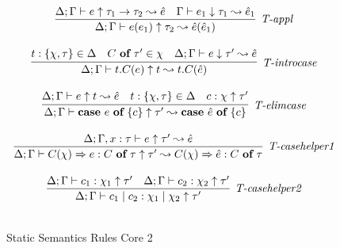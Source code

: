 \begin{figure}
\[\begin{array}{c}
\infer[\textit{T-appl}]
	{\Delta; \Gamma \vdash  e(e_1) \uparrow\tau_2  \leadsto \hat{e}(\hat{e}_1) } 
	{\Delta; \Gamma \vdash e \uparrow \tau_1 \rightarrow \tau_2  \leadsto \hat{e}  & \Gamma \vdash e_1 \downarrow \tau_1 \leadsto \hat{e}_1 }\\[3ex]

\infer[\textit{T-introcase}]
	{\Delta; \Gamma \vdash  t.C(e) \uparrow t  \leadsto t.C(\hat{e}) } 
	{t:\{\chi, \tau\} \in \Delta & C\ \keyw{of}\ \tau' \in \chi &\Delta; \Gamma \vdash e \downarrow \tau'  \leadsto \hat{e}}\\[3ex]

\infer[\textit{T-elimcase}]
	{\Delta; \Gamma \vdash  \keyw{case}~e~\keyw{of}~\{ c \} \uparrow\tau'  \leadsto \keyw{case}~\hat{e}~\keyw{of}~\{ c \} } 
	{\Delta; \Gamma \vdash e \uparrow t  \leadsto \hat{e}  & t:\{ \chi,\tau\} \in \Delta & c:\chi \uparrow \tau'}\\[3ex]

\infer[\textit{T-casehelper1}]
	{\Delta; \Gamma \vdash  C(\chi)\Rightarrow e : C\ \keyw{of}\ \tau \uparrow \tau' \leadsto C(\chi)\Rightarrow \hat{e} : C\ \keyw{of}\ \tau} 
	{\Delta; \Gamma, x:\tau \vdash e \uparrow \tau' \leadsto \hat{e}}\\[3ex]

\infer[\textit{T-casehelper2}]
	{\Delta; \Gamma \vdash  c_1 \bnfalt c_2: \chi_1 \bnfalt \chi_2 \uparrow \tau' } 
	{\Delta; \Gamma \vdash c_1:\chi_1 \uparrow \tau' & \Delta; \Gamma \vdash c_2:\chi_2 \uparrow \tau'}\\[3ex]


\end{array}
\]
\caption{Static Semantics Rules Core 2}
\end{figure}

